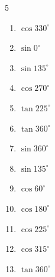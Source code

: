 \begin{multicols}{5}
\begin{enumerate}

  \item $\displaystyle \cos{330^\circ}$


  \item $\displaystyle \sin{0^\circ}$

        \phantom{$\displaystyle =0$}

  \item $\displaystyle \sin{135^\circ}$


  \item $\displaystyle \cos{270^\circ}$

        \phantom{$\displaystyle =0$}

  \item $\displaystyle \tan{225^\circ}$

        \phantom{$\displaystyle =1$}

  \item $\displaystyle \tan{360^\circ}$

        \phantom{$\displaystyle =0$}

  \item $\displaystyle \sin{360^\circ}$

        \phantom{$\displaystyle =0$}

  \item $\displaystyle \sin{135^\circ}$


  \item $\displaystyle \cos{60^\circ}$


  \item $\displaystyle \cos{180^\circ}$

        \phantom{$\displaystyle =-1$}

  \item $\displaystyle \cos{225^\circ}$


  \item $\displaystyle \cos{315^\circ}$


  \item $\displaystyle \tan{360^\circ}$


\end{enumerate}
\end{multicols}
